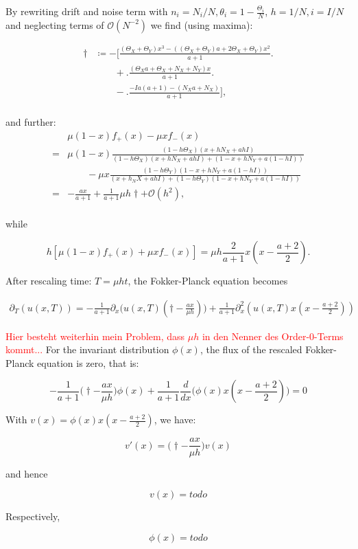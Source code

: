 By rewriting drift and noise term with $n_i = N_i/N, \theta_i = 1- \frac{\Theta_i}{N}$, $h = 1/N, i= I/N$ and neglecting terms of $\mathcal{O}(N^{-2})$ we find (using maxima):

\begin{align*}
\dagger &\coloneqq -\Big[\frac{(\Theta_X + \Theta_Y)x^3 - ((\Theta_X + \Theta_Y)a + 2\Theta_X + \Theta_Y)x^2}{a+1}\Big.\\
&\qquad + \Big.\frac{(\Theta_X a + \Theta_X + N_X + N_Y)x}{a+1}\Big.\\
&\qquad - \Big.\frac{-Ia(a+1) - (N_X a + N_X)}{a+1}\Big],\\
\end{align*}

and further: 
\begin{align*}
& \mu(1-x)f_+(x) - \mu xf_-(x)\\
= & \mu(1-x) \frac{(1-h\Theta_X) (x+ hN_X+ ahI)}{(1-h\Theta_X) (x + hN_X + ahI) + (1-x + hN_Y + a(1-hI))}\\
&\qquad - \mu x \frac{(1-h\Theta_Y)(1-x+hN_Y+a(1-hI))}{(x+h_NX+ahI) + (1-h\Theta_Y)(1-x+hN_Y+a(1-hI))}\\
=& -\frac{ax}{a+1} + \frac{1}{a+1}\mu h \dagger + \mathcal{O}(h^2),\\
\end{align*}

while 

\begin{equation*}
h\left[\mu(1-x)f_+(x) + \mu xf_-(x)\right] = \mu h \frac{2}{a+1} x(x-\frac{a+2}{2}).
\end{equation*}

After rescaling time: $T = \mu h t$, the Fokker-Planck equation becomes

\begin{align*}
\partial_T \left(u\left(x, T\right)\right) = -\frac{1}{a+1}\partial_x\big(u(x,T)\left(\dagger - \frac{ax}{\mu h} \right)\big) + \frac{1}{a+1} \partial^2_x\left(u(x,T)x(x-\frac{a+2}{2})\right)
\end{align*}

\textcolor{red}{Hier besteht weiterhin mein Problem, dass $\mu h$ in den Nenner des Order-0-Terms kommt...}\newline
For the invariant distribution $\phi(x)$, the flux of the rescaled Fokker-Planck equation is zero, that is:

\begin{equation*}
-\frac{1}{a+1}\Big(\dagger - \frac{ax}{\mu h}\Big)\phi(x) + \frac{1}{a+1} \frac{d}{dx}\Big(\phi(x)x(x-\frac{a+2}{2})\Big)= 0
\end{equation*}

With $v(x) = \phi(x)x(x-\frac{a+2}{2})$, we have:

\begin{equation*}
v'(x) = \Big(\dagger - \frac{ax}{\mu h}\Big)v(x)
\end{equation*}

and hence

\begin{equation*}
v(x) = todo
\end{equation*}

Respectively,

\begin{equation*}
\phi(x) = todo
\end{equation*}
